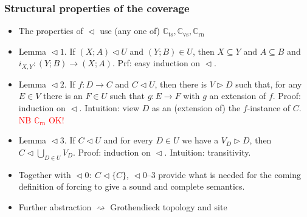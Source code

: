 \documentclass[handout,11pt]{beamer}
\newcommand{\red}[1]{\textcolor{red}{#1}}
\newcommand{\set}[1]{\{#1\}}
\newcommand{\covd}{\mathrel{\vartriangleleft}}
\newcommand{\covs}{\mathrel{\vartriangleright}}
\newcommand{\covT}{\mathrel{\vartriangleleft_T}}
\newcommand*{\subvs}{_{\mathrm{vs}}}
\newcommand*{\subrn}{_{\mathrm{rn}}}
\newcommand*{\subts}{_{\mathrm{ts}}}
\newcommand{\Cvs}{\mathbb{C}\subvs}
\newcommand{\Crn}{\mathbb{C}\subrn}
\newcommand{\Cts}{\mathbb{C}\subts}
\begin{document}
\begin{frame}
\frametitle{Structural properties of the coverage}
 \begin{itemize}[<+->]   %
    \item The properties of $\covd$ use (any one of) $\Cts,\Cvs,\Crn$
    \item Lemma ${\covd}1$. If $(X;A) \covd U$ and $(Y;B)\in U$,
    then $X\subseteq Y$ and $A\subseteq B$ and $i_{X,Y} : (Y;B)\to(X;A)$.
    Prf: easy induction on $\covd$.
    \item Lemma ${\covd}2$. If $f:D\to C$ and $C\covd U$, then there is
    $V\covs D$ such that, for any $E\in V$ there is an $F\in U$ such 
    that $g:E\to F$ with $g$ an extension of $f$.
    Proof: induction on $\covd$. Intuition: view $D$ as an (extension of) the
    $f$-instance of $C$. \red{NB $\Crn$ OK!}
    \item Lemma ${\covd}3$. If $C \covd U$ and for every $D\in U$
    we have a $V_D \covs D$, then $C\covd\bigcup_{D\in U} V_D$.
    Proof: induction on $\covd$. Intuition: transitivity.
    \item Together with ${\covd}0:~C \covd\set{C}$, ${\covd}$0--3
    provide what is needed for the coming definition of forcing to
    give a sound and complete semantics.
    \item Further abstraction $\rightsquigarrow$ Grothendieck topology and site
    
 \end{itemize}
\end{frame}
\end{document}
